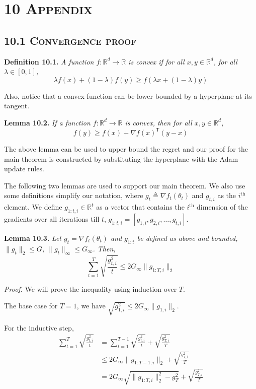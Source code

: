 \documentclass[11pt]{article}
\begin{document}
\newpage

\setcounter{equation}{12}

\section*{10 \textsc{Appendix}}

\subsection*{10.1 \textsc{Convergence proof}}

\noindent\textbf{Definition 10.1.} \emph{A function
$f : \mathbb{R}^d \to \mathbb{R}$ is convex if for all
$x, y \in \mathbb{R}^d$, for all $\lambda \in [0, 1]$,}
\[
\lambda f(x) + (1 - \lambda) f(y) \geq f(\lambda x + (1 - \lambda) y)
\]

\noindent
Also, notice that a convex function can be lower bounded by a
hyperplane at its tangent.

\noindent\textbf{Lemma 10.2.} \emph{If a function
$f : \mathbb{R}^d \to \mathbb{R}$ is convex, then for all
$x, y \in \mathbb{R}^d$,}
\[
f(y) \geq f(x) + \nabla f(x)^\mathsf{T}(y - x)
\]

\noindent
The above lemma can be used to upper bound the regret and our
proof for the main theorem is constructed by substituting the
hyperplane with the Adam update rules.

The following two lemmas are used to support our main theorem.
We also use some definitions simplify our notation, where
$g_t \triangleq \nabla f_t(\theta_t)$ and $g_{t,i}$ as the
$i^\text{th}$ element. We define $g_{1:t,i} \in \mathbb{R}^t$ as
a vector that contains the $i^\text{th}$ dimension of the
gradients over all iterations till $t$,
$g_{1:t,i} = [g_{1,i}, g_{2,i}, \ldots, g_{t,i}]$.

\noindent\textbf{Lemma 10.3.} \emph{Let $g_t = \nabla f_t(\theta_t)$
and $g_{1:t}$ be defined as above and bounded,
$\|g_t\|_2 \leq G$, $\|g_t\|_\infty \leq G_\infty$. Then,}
\[
\sum_{t=1}^{T} \sqrt{\frac{g_{t,i}^2}{t}} \leq 2 G_\infty \|g_{1:T,i}\|_2
\]

\noindent\emph{Proof.} We will prove the inequality using
induction over $T$.

The base case for $T = 1$, we have
$\sqrt{g_{1,i}^2} \leq 2 G_\infty \|g_{1,i}\|_2$.

For the inductive step,
\begin{align*}
\sum_{t=1}^{T} \sqrt{\frac{g_{t,i}^2}{t}}
 &= \sum_{t=1}^{T-1} \sqrt{\frac{g_{t,i}^2}{t}} + \sqrt{\frac{g_{T,i}^2}{T}} \\
 &\leq 2 G_\infty \|g_{1:T-1,i}\|_2 + \sqrt{\frac{g_{T,i}^2}{T}} \\
 &= 2 G_\infty \sqrt{\|g_{1:T,i}\|_2^2 - g_T^2} + \sqrt{\frac{g_{T,i}^2}{T}}
\end{align*}
\end{document}
